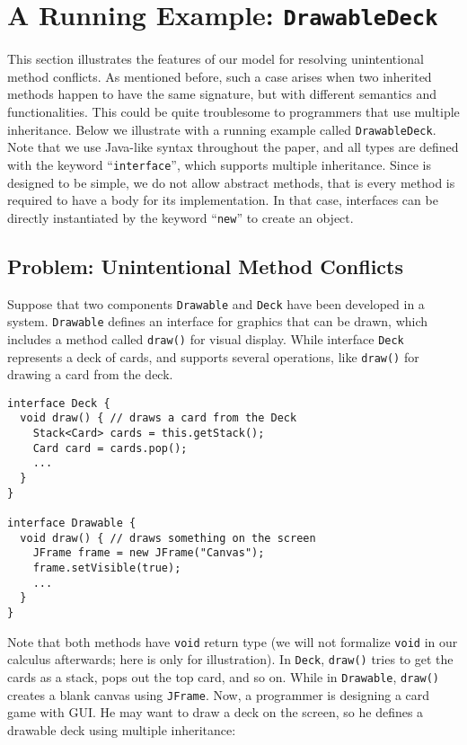 \section{A Running Example: \lstinline{DrawableDeck}}

This section illustrates the features of our \MIM{} model for resolving unintentional method
conflicts. As mentioned before, such a case arises when two inherited methods happen to have the
same signature, but with different semantics and functionalities. This could be quite troublesome
to programmers that use multiple inheritance. Below we illustrate with a running example called \lstinline|DrawableDeck|.
Note that we use Java-like syntax throughout the paper, and all types are defined with the keyword ``\lstinline|interface|'', which
supports multiple inheritance. Since \MIM{} is designed to be simple, we do not allow abstract methods, that is every method
is required to have a body for its implementation. In that case, interfaces can be directly instantiated by the keyword ``\lstinline|new|''
to create an object.

\subsection{Problem: Unintentional Method Conflicts}

Suppose that two components \lstinline|Drawable| and \lstinline|Deck| have been developed in a system.
\lstinline|Drawable| defines an interface for graphics that can be drawn, which includes a method called \lstinline|draw()|
for visual display. While interface \lstinline|Deck| represents a deck of cards, and supports several operations, like
\lstinline|draw()| for drawing a card from the deck.

\begin{lstlisting}
interface Deck {
  void draw() { // draws a card from the Deck
    Stack<Card> cards = this.getStack();
    Card card = cards.pop();
    ...
  }
}

interface Drawable {
  void draw() { // draws something on the screen
    JFrame frame = new JFrame("Canvas");
    frame.setVisible(true);
    ...
  }
}
\end{lstlisting}
Note that both methods have \lstinline|void| return type (we will not formalize
\lstinline|void| in our calculus afterwards; here is only for illustration). In \lstinline|Deck|, \lstinline|draw()| tries to get the cards as a stack, pops
out the top card, and so on. While in \lstinline|Drawable|, \lstinline|draw()|
creates a blank canvas using \lstinline|JFrame|. Now, a programmer is designing a
card game with GUI. He may want to draw a deck on the screen, so he defines a drawable
deck using multiple inheritance:

